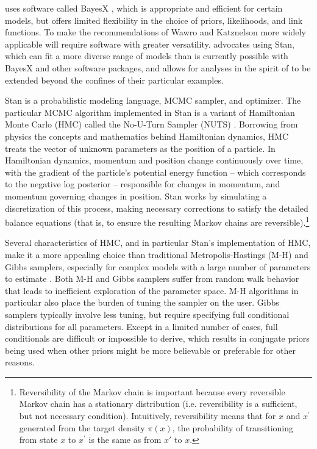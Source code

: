  uses software called BayesX , which is appropriate and  efficient for certain models, but offers limited flexibility in the choice of priors, likelihoods, and link functions. To make the recommendations of Wawro and Katznelson more widely applicable will require software with greater versatility.  advocates using Stan, which can fit a more diverse range of models than is currently possible with BayesX and other software packages, and allows for analyses in the spirit of  to be extended beyond the confines of their particular examples.  

Stan is a probabilistic modeling language, MCMC sampler, and optimizer. The particular MCMC algorithm implemented in Stan is a variant of Hamiltonian Monte Carlo (HMC) called the No-U-Turn Sampler (NUTS) . Borrowing from physics the concepts and mathematics behind Hamiltonian dynamics, HMC treats the vector of unknown parameters as the position of a particle. In Hamiltonian dynamics, momentum and position change continuously over time, with the gradient of the particle's potential energy function --  which corresponds to the negative log posterior -- responsible for changes in momentum, and momentum governing changes in position. Stan works by simulating a discretization of this process, making necessary corrections to satisfy the detailed balance equations (that is, to ensure the resulting Markov chains are reversible).\footnote{Reversibility of the Markov chain is important because every reversible Markov chain has a stationary distribution (i.e. reversibility is a sufficient, but not necessary condition). Intuitively, reversibility means that for $x$ and $x^\prime$ generated from the target density $\pi(x)$, the probability of transitioning from state $x$ to $x^\prime$ is the same as from $x'$ to $x$.}  

Several characteristics of HMC, and in particular Stan's implementation of HMC, make it a more appealing choice than traditional Metropolis-Hastings (M-H) and Gibbs samplers, especially for complex models with a large number of parameters to estimate . Both M-H and Gibbs samplers suffer from random walk behavior that leads to inefficient exploration of the parameter space. M-H algorithms in particular also place the burden of tuning the sampler on the user. Gibbs samplers typically involve less tuning, but require specifying full conditional distributions for all parameters. Except in a limited number of cases, full conditionals are difficult or impossible to derive, which results in conjugate priors being used when other priors might be more believable or preferable for other reasons. 

